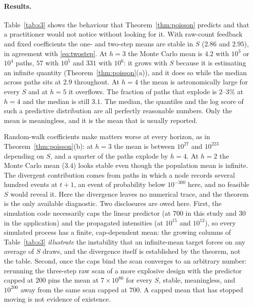 \documentclass[12pt]{article}
\theoremstyle{plain}
\theoremstyle{definition}
\theoremstyle{remark}
\begin{document}
\paragraph{Results.} Table~\ref{tab:s3} shows the behaviour that Theorem~\ref{thm:poisson} predicts and that a practitioner would not notice without looking for it. With raw-count feedback and fixed coefficients the one- and two-step means are stable in $S$ ($2.86$ and $2.95$), in agreement with \eqref{eq:twostep}. At $h=3$ the Monte Carlo mean is $4.2$ with $10^3$ or $10^4$ paths, $57$ with $10^5$ and $331$ with $10^6$: it grows with $S$ because it is estimating an infinite quantity (Theorem~\ref{thm:poisson}(a)), and it does so while the median across paths sits at $2.9$ throughout. At $h=4$ the mean is astronomically large for every $S$ and at $h=5$ it overflows. The fraction of paths that explode is $2$--$3\%$ at $h=4$ and the median is still $3.1$. The median, the quantiles and the log score of such a predictive distribution are all perfectly reasonable numbers. Only the mean is meaningless, and it is the mean that is usually reported.

Random-walk coefficients make matters worse at every horizon, as in Theorem~\ref{thm:poisson}(b): at $h=3$ the mean is between $10^{27}$ and $10^{223}$ depending on $S$, and a quarter of the paths explode by $h=4$. At $h=2$ the Monte Carlo mean ($3.4$) looks stable even though the population mean is infinite. The divergent contribution comes from paths in which a node records several hundred events at $t+1$, an event of probability below $10^{-300}$ here, and no feasible $S$ would reveal it. Here the divergence leaves no numerical trace, and the theorem is the only available diagnostic. Two disclosures are owed here. First, the simulation code necessarily caps the linear predictor (at $700$ in this study and $30$ in the application) and the propagated intensities (at $10^{15}$ and $10^{12}$), so every simulated process has a finite, cap-dependent mean: the growing columns of Table~\ref{tab:s3} \emph{illustrate} the instability that an infinite-mean target forces on any average of $S$ draws, and the divergence itself is established by the theorem, not the table. Second, once the caps bind the scan converges to an arbitrary number: rerunning the three-step raw scan of a more explosive design with the predictor capped at $200$ pins the mean at $7\times10^{86}$ for every $S$, stable, meaningless, and $10^{200}$ away from the same scan capped at $700$. A capped mean that has stopped moving is not evidence of existence.
\end{document}
